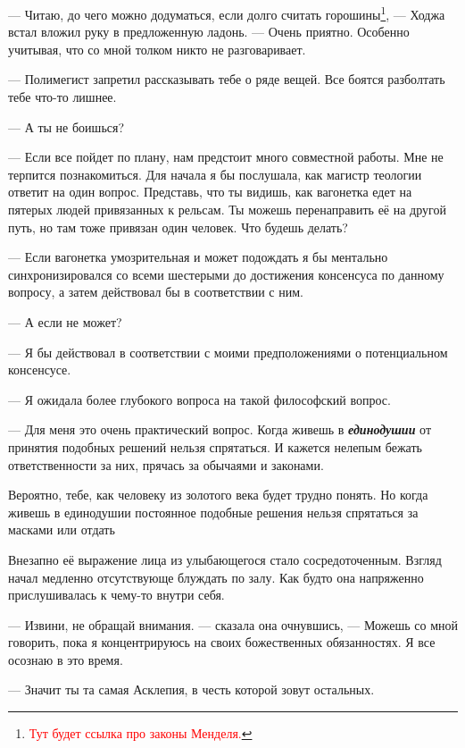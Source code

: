 \documentclass[12pt,a4paper]{article}
\newcommand{\tr}[1]{\textcolor{red}{#1}}
\newcommand{\todo}[1]{\marginpar{\scriptsize \tr{#1}}}
\begin{document}
--- Читаю, до чего можно додуматься, если долго считать горошины\footnote{\tr{Тут будет ссылка про законы Менделя.}}, --- Ходжа встал вложил руку в предложенную ладонь. --- Очень приятно. Особенно учитывая, что со мной толком никто не разговаривает.

--- Полимегист запретил рассказывать тебе о ряде вещей. Все боятся разболтать тебе что-то лишнее.

--- А ты не боишься?

--- Если все пойдет по плану, нам предстоит много совместной работы. Мне не терпится познакомиться. Для начала я бы послушала, как магистр теологии ответит на один вопрос. \todo{фентезийная, но узнаваемая версия дилеммы вагонетки} Представь, что ты видишь, как вагонетка едет на пятерых людей привязанных к рельсам. Ты можешь перенаправить её на другой путь, но там тоже привязан один человек. Что будешь делать?

--- Если вагонетка умозрительная и может подождать я бы ментально синхронизировался со всеми шестерыми до достижения консенсуса по данному вопросу, а затем действовал бы в соответствии с ним.

--- А если не может?

--- Я бы действовал в соответствии с моими предположениями о потенциальном консенсусе.


--- Я ожидала более глубокого вопроса на такой философский вопрос.

--- Для меня это очень практический вопрос. Когда живешь в \textbf{\textit{единодушии}} от принятия подобных решений нельзя спрятаться. И кажется нелепым бежать ответственности за них, прячась за обычаями и законами.

Вероятно, тебе, как человеку из золотого века будет трудно понять. Но когда живешь в единодушии постоянное подобные решения нельзя спрятаться за масками или отдать



Внезапно её выражение лица из улыбающегося стало сосредоточенным. Взгляд начал медленно отсутствующе блуждать по залу. Как будто она напряженно прислушивалась к чему-то внутри себя.

--- Извини, не обращай внимания. --- сказала она очнувшись, --- Можешь со мной говорить, пока я концентрируюсь на своих божественных обязанностях. Я все осознаю в это время.

--- Значит ты та самая Асклепия, в честь которой зовут остальных.
\end{document}
